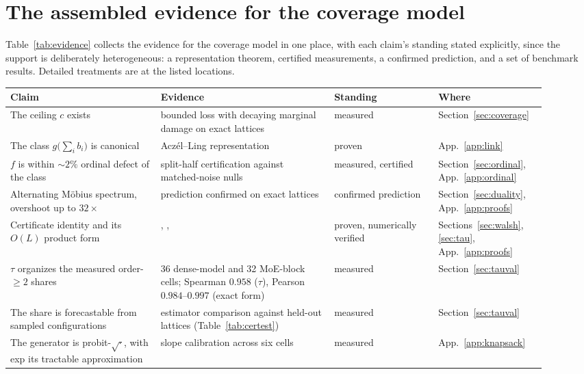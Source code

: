 \section{The assembled evidence for the coverage model}\label{app:evidence}

Table~\ref{tab:evidence} collects the evidence for the coverage model in one place, with each claim's
standing stated explicitly, since the support is deliberately heterogeneous: a representation
theorem, certified measurements, a confirmed prediction, and a set of benchmark results. Detailed
treatments are at the listed locations.

\begin{table}[h]
  \centering
  \footnotesize
  \begin{tabular}{@{}p{0.26\linewidth}p{0.30\linewidth}p{0.18\linewidth}p{0.17\linewidth}@{}}
    \toprule
    Claim & Evidence & Standing & Where \\
    \midrule
    The ceiling $c$ exists & bounded loss with decaying marginal damage on exact lattices & measured & Section~\ref{sec:coverage} \\
    The class $g\bigl(\sum_i b_i\bigr)$ is canonical & Acz\'el--Ling representation & proven & App.~\ref{app:link} \\
    $f$ is within ${\sim}2\%$ ordinal defect of the class & split-half certification against matched-noise nulls & measured, certified & Section~\ref{sec:ordinal}, App.~\ref{app:ordinal} \\
    Alternating M\"obius spectrum, overshoot up to $32\times$ & \thmthree{} prediction confirmed on exact lattices & confirmed prediction & Section~\ref{sec:duality}, App.~\ref{app:proofs} \\
    Certificate identity and its $O(L)$ product form & \thmone{}, \thmfour{}, \propfive{} & proven, numerically verified & Sections~\ref{sec:walsh}, \ref{sec:tau}, App.~\ref{app:proofs} \\
    $\tau$ organizes the measured order-$\ge 2$ shares & 36 dense-model and 32 MoE-block cells; Spearman $0.958$ ($\tau$), Pearson $0.984$--$0.997$ (exact form) & measured & Section~\ref{sec:tauval} \\
    The share is forecastable from sampled configurations & estimator comparison against held-out lattices (Table~\ref{tab:certest}) & measured & Section~\ref{sec:tauval} \\
    The generator is probit-$\sqrt{\cdot}$, with exp its tractable approximation & slope calibration across six cells & measured & App.~\ref{app:knapsack} \\

\end{tabular}
\end{table}
